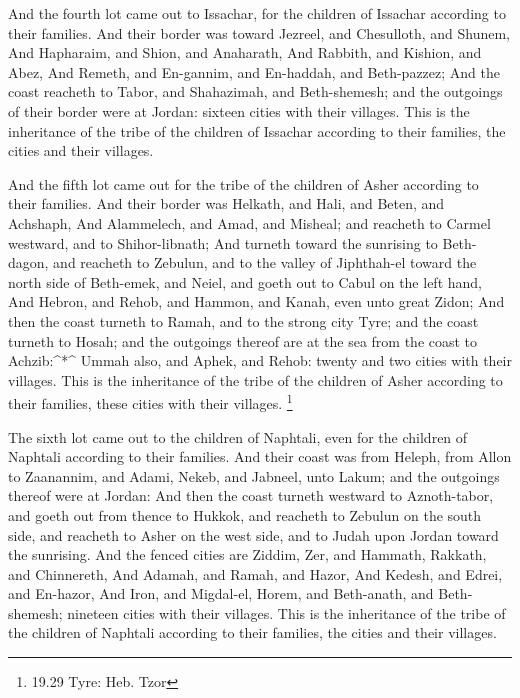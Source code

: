  And the fourth lot came out to Issachar, for the children
of Issachar according to their families.  And their border
was toward Jezreel, and Chesulloth, and Shunem,  And
Hapharaim, and Shion, and Anaharath,  And Rabbith, and
Kishion, and Abez,  And Remeth, and En-gannim, and
En-haddah, and Beth-pazzez;  And the coast reacheth to
Tabor, and Shahazimah, and Beth-shemesh; and the outgoings of their
border were at Jordan: sixteen cities with their villages. 
This is the inheritance of the tribe of the children of Issachar
according to their families, the cities and their villages.

 And the fifth lot came out for the tribe of the children
of Asher according to their families.  And their border was
Helkath, and Hali, and Beten, and Achshaph,  And
Alammelech, and Amad, and Misheal; and reacheth to Carmel westward, and
to Shihor-libnath;  And turneth toward the sunrising to
Beth-dagon, and reacheth to Zebulun, and to the valley of Jiphthah-el
toward the north side of Beth-emek, and Neiel, and goeth out to Cabul on
the left hand,  And Hebron, and Rehob, and Hammon, and
Kanah, even unto great Zidon;  And then the coast turneth
to Ramah, and to the strong city Tyre; and the coast turneth to Hosah;
and the outgoings thereof are at the sea from the coast to
Achzib:\^{}*\^{}  Ummah also, and Aphek, and Rehob: twenty
and two cities with their villages.  This is the
inheritance of the tribe of the children of Asher according to their
families, these cities with their villages. \footnote{19.29 Tyre: Heb.
  Tzor}

 The sixth lot came out to the children of Naphtali, even
for the children of Naphtali according to their families. 
And their coast was from Heleph, from Allon to Zaanannim, and Adami,
Nekeb, and Jabneel, unto Lakum; and the outgoings thereof were at
Jordan:  And then the coast turneth westward to
Aznoth-tabor, and goeth out from thence to Hukkok, and reacheth to
Zebulun on the south side, and reacheth to Asher on the west side, and
to Judah upon Jordan toward the sunrising.  And the fenced
cities are Ziddim, Zer, and Hammath, Rakkath, and Chinnereth,
 And Adamah, and Ramah, and Hazor,  And
Kedesh, and Edrei, and En-hazor,  And Iron, and Migdal-el,
Horem, and Beth-anath, and Beth-shemesh; nineteen cities with their
villages.  This is the inheritance of the tribe of the
children of Naphtali according to their families, the cities and their
villages.

